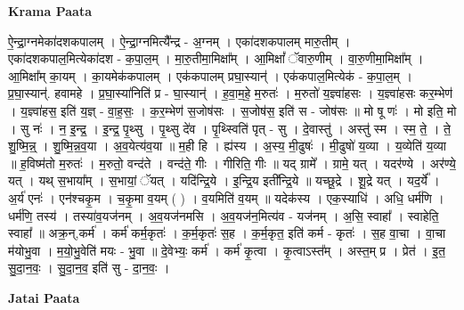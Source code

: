 \documentclass[17pt]{extarticle}
\begin{document}
\textbf{Krama Paata} \newline

ऐ॒न्द्रा॒ग्नमेका॑दशकपालम् । ऐ॒न्द्रा॒ग्नमित्यै᳚न्द्र - अ॒ग्नम् । एका॑दशकपालम् मारु॒तीम् । एका॑दशकपाल॒मित्येका॑दश - क॒पा॒ल॒म् । मा॒रु॒तीमा॒मिक्षा᳚म् । आ॒मिक्षां᳚ ॅवारु॒णीम् । वा॒रु॒णीमा॒मिक्षा᳚म् । आ॒मिक्षा᳚म् का॒यम् । का॒यमेक॑कपालम् । एक॑कपालम् प्रघा॒स्यान्॑ । एक॑कपाल॒मित्येक॑ - क॒पा॒ल॒म् । प्र॒घा॒स्यान्॑. हवामहे । प्र॒घा॒स्या॑निति॑ प्र - घा॒स्यान्॑ । ह॒वा॒म॒हे॒ म॒रुतः॑ । म॒रुतो॑ य॒ज्ञ्वा॑हसः । य॒ज्ञ्वा॑हसः कर॒म्भेण॑ । य॒ज्ञ्वा॑हस॒ इति॑ य॒ज्ञ् - वा॒ह॒सः॒ । क॒र॒म्भेण॑ स॒जोष॑सः । स॒जोष॑स॒ इति॑ स - जोष॑सः ॥ मो षू णः॑ । मो इति॒ मो । सु नः॑ । न॒ इ॒न्द्र॒ । इ॒न्द्र॒ पृ॒थ्सु । पृ॒थ्सु दे॑व । पृ॒थ्स्विति॑ पृत् - सु । दे॒वास्तु॑ । अस्तु॑ स्म । स्म॒ ते॒ । ते॒ शु॒ष्मि॒न्न्॒ । शु॒ष्मि॒न्न॒व॒या । अ॒व॒येत्य॑व॒या ॥ म॒ही हि । ह्य॑स्य । अ॒स्य॒ मी॒ढुषः॑ । मी॒ढुषो॑ य॒व्या । य॒व्येति॑ य॒व्या ॥ ह॒विष्म॑तो म॒रुतः॑ । म॒रुतो॒ वन्द॑ते । वन्द॑ते॒ गीः । गीरिति॒ गीः ॥ यद् ग्रामे᳚ । ग्रामे॒ यत् । यदर॑ण्ये । अर॑ण्ये॒ यत् । यथ् स॒भाया᳚म् । स॒भायां॒ ॅयत् । यदि॑न्द्रि॒ये । इ॒न्द्रि॒य इती᳚न्द्रि॒ये ॥ यच्छू॒द्रे । शू॒द्रे यत् । यद॒र्ये᳚ । अ॒र्य॑ एनः॑ । एन॑श्चकृ॒म । च॒कृ॒मा व॒यम् ( ) । व॒यमिति॑ व॒यम् ॥ यदेक॑स्य । एक॒स्याधि॑ । अधि॒ धर्म॑णि । धर्म॑णि॒ तस्य॑ । तस्या॑व॒यज॑नम् । अ॒व॒यज॑नमसि । अ॒व॒यज॑न॒मित्य॑व - यज॑नम् । अ॒सि॒ स्वाहा᳚ । स्वाहेति॒ स्वाहा᳚ ॥ अक्र॒न्,कर्म॑ । कर्म॑ कर्म॒कृतः॑ । क॒र्म॒कृतः॑ स॒ह । क॒र्म॒कृत॒ इति॑ कर्म - कृतः॑ । स॒ह वा॒चा । वा॒चा म॑योभु॒वा । म॒यो॒भु॒वेति॑ मयः - भु॒वा ॥ दे॒वेभ्यः॒ कर्म॑ । कर्म॑ कृ॒त्वा । कृ॒त्वाऽस्त᳚म् । अस्त॒म् प्र । प्रेत॑ । इ॒त॒ सु॒दा॒न॒वः॒ । सु॒दा॒न॒व॒ इति॑ सु - दा॒न॒वः॒ । \newline

\textbf{Jatai Paata} \newline
\end{document}
